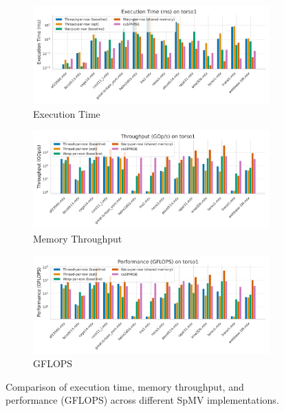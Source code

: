 \documentclass[conference]{IEEEtran}
\begin{document}
\begin{figure}[t]
    \centering
    \begin{subfigure}{0.95\textwidth}
        \centering
        \includegraphics[width=\linewidth]{execution_time.png}
        \caption{Execution Time}
        \label{fig:exectimeimg}
    \end{subfigure}
    \vspace{1em}
    
    \begin{subfigure}{0.95\textwidth}
        \centering
        \includegraphics[width=\linewidth]{throughput.png}
        \caption{Memory Throughput}
        \label{fig:throughputimg}
    \end{subfigure}
    \vspace{1em}

    \begin{subfigure}{0.95\textwidth}
        \centering
        \includegraphics[width=\linewidth]{performance.png}
        \caption{GFLOPS}
        \label{fig:gflopsimg}
    \end{subfigure}
    
    \caption{Comparison of execution time, memory throughput, and performance (GFLOPS) across different SpMV implementations.}
    \label{fig:all_metrics_vertical}
\end{figure}
\end{document}
